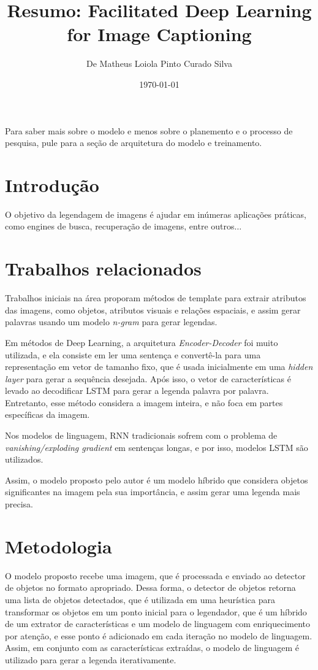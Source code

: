 \documentclass[12pt]{article}
\title{Resumo: Facilitated Deep Learning for Image Captioning}
\author{De Matheus Loiola Pinto Curado Silva}
\date{\today}
\begin{document}
\maketitle


Para saber mais sobre o modelo e menos sobre o planemento e o processo de pesquisa, pule para a seção de arquitetura do modelo e treinamento.

\section*{Introdução}

O objetivo da legendagem de imagens é ajudar em inúmeras aplicações práticas, como engines de busca, recuperação de imagens, entre outros$\ldots$

\section*{Trabalhos relacionados}

Trabalhos iniciais na área proporam métodos de template para extrair atributos das imagens, como objetos, atributos visuais e relações espaciais, e assim gerar palavras usando um modelo \textit{n-gram} para gerar legendas.

Em métodos de Deep Learning, a arquitetura \textit{Encoder-Decoder} foi muito utilizada, e ela consiste em ler uma sentença e convertê-la para uma representação em vetor de tamanho fixo, que é usada inicialmente em uma \textit{hidden layer} para gerar a sequência desejada. Após isso, o vetor de características é levado ao decodificar LSTM para gerar a legenda palavra por palavra. Entretanto, esse método considera a imagem inteira, e não foca em partes específicas da imagem.

Nos modelos de linguagem, RNN tradicionais sofrem com o problema de \textit{vanishing/exploding gradient} em sentenças longas, e por isso, modelos LSTM são utilizados. 

Assim, o modelo proposto pelo autor é um modelo híbrido que considera objetos significantes na imagem pela sua importância, e assim gerar uma legenda mais precisa.

\section*{Metodologia}

O modelo proposto recebe uma imagem, que é processada e enviado ao detector de objetos no formato apropriado. Dessa forma, o detector de objetos retorna uma lista de objetos detectados, que é utilizada em uma heurística para transformar os objetos em um ponto inicial para o legendador, que é um híbrido de um extrator de características e um modelo de linguagem com enriquecimento por atenção, e esse ponto é adicionado em cada iteração no modelo de linguagem. Assim, em conjunto com as características extraídas, o modelo de linguagem é utilizado para gerar a legenda iterativamente.
\end{document}
